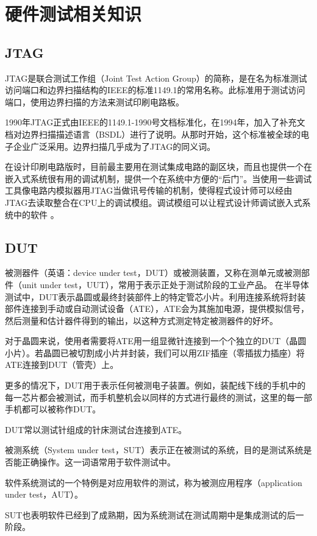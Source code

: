 

\section{硬件测试相关知识}
\subsection{JTAG}
JTAG是联合测试工作组（Joint Test Action Group）的简称，是在名为标准测试访问端口和边界扫描结构的IEEE的标准1149.1的常用名称。此标准用于测试访问端口，使用边界扫描的方法来测试印刷电路板。

1990年JTAG正式由IEEE的1149.1-1990号文档标准化，在1994年，加入了补充文档对边界扫描描述语言（BSDL）进行了说明。从那时开始，这个标准被全球的电子企业广泛采用。边界扫描几乎成为了JTAG的同义词。

在设计印刷电路版时，目前最主要用在测试集成电路的副区块，而且也提供一个在嵌入式系统很有用的调试机制，提供一个在系统中方便的``后门''。当使用一些调试工具像电路内模拟器用JTAG当做讯号传输的机制，使得程式设计师可以经由JTAG去读取整合在CPU上的调试模组。调试模组可以让程式设计师调试嵌入式系统中的软件 。

\subsection{DUT}
被测器件（英语：device under test，DUT）或被测装置，又称在测单元或被测部件（unit under test，UUT），常用于表示正处于测试阶段的工业产品。
在半导体测试中，DUT表示晶圆或最终封装部件上的特定管芯小片。利用连接系统将封装部件连接到手动或自动测试设备（ATE），ATE会为其施加电源，提供模拟信号，然后测量和估计器件得到的输出，以这种方式测定特定被测器件的好坏。

对于晶圆来说，使用者需要将ATE用一组显微针连接到一个个独立的DUT（晶圆小片）。若晶圆已被切割成小片并封装，我们可以用ZIF插座（零插拔力插座）将ATE连接到DUT（管壳）上。

更多的情况下，DUT用于表示任何被测电子装置。例如，装配线下线的手机中的每一芯片都会被测试，而手机整机会以同样的方式进行最终的测试，这里的每一部手机都可以被称作DUT。

DUT常以测试针组成的针床测试台连接到ATE。

被测系统（System under test，SUT）表示正在被测试的系统，目的是测试系统是否能正确操作。这一词语常用于软件测试中。

软件系统测试的一个特例是对应用软件的测试，称为被测应用程序（application under test，AUT）。

SUT也表明软件已经到了成熟期，因为系统测试在测试周期中是集成测试的后一阶段。
